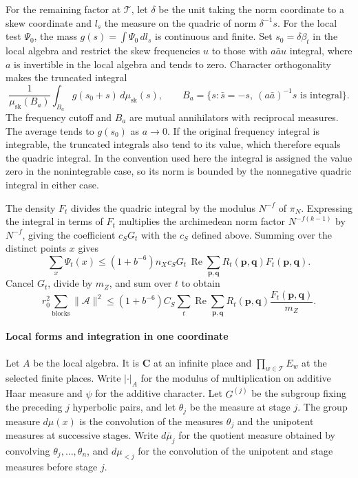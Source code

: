 For the remaining factor at \(\mathcal T\), let \(\delta\) be the unit
taking the norm coordinate to a skew coordinate and \(l_s\) the
measure on the quadric of norm \(\delta^{-1}s\).
For the local test \(\Psi_0\), the mass \(g(s)=\int\Psi_0\,dl_s\) is
continuous and finite. Set \(s_0=\delta\beta_t\) in the local algebra and
restrict the skew frequencies \(u\) to those with \(a\bar a u\) integral,
where \(a\) is invertible in the local algebra and tends to zero.
Character orthogonality makes the truncated integral
\[
 \frac{1}{\mu_\mathrm{sk}(B_a)}
       \int_{B_a}g(s_0+s)\,d\mu_\mathrm{sk}(s),\qquad
 B_a=\{s:\bar s=-s,\ (a\bar a)^{-1}s\text{ is integral}\}.
\]
The frequency cutoff and \(B_a\) are mutual annihilators with reciprocal
measures. The average tends to \(g(s_0)\) as \(a\to0\).
If the original frequency integral is integrable, the truncated
integrals also tend to its value, which therefore equals the quadric
integral. In the convention used here the integral is assigned the value
zero in the nonintegrable case, so its norm is bounded by the
nonnegative quadric integral in either case.

The density \(F_t\) divides the quadric integral by
the modulus \(N^{-f}\) of \(\pi_N\). Expressing the integral in terms of
\(F_t\) multiplies the archimedean norm factor \(N^{-f(k-1)}\) by \(N^{-f}\),
giving the coefficient \(c_SG_t\) with the \(c_S\) defined above.
Summing over the distinct points \(x\) gives
\[
 \sum_x\Psi_t(x)\le(1+b^{-6})n_X c_S G_t\,
             \operatorname{Re}\sum_{\mathbf p,\mathbf q}R_t(\mathbf p,\mathbf q)
                                                       F_t(\mathbf p,\mathbf q).
\]
Cancel \(G_t\), divide by \(m_Z\), and sum over \(t\) to obtain
\begin{equation}\label{eq:span-siegel-sum}
 r_0^2\sum_{\mathrm{blocks}}\|\mathcal A\|^2
 \le (1+b^{-6})C_S\sum_t\operatorname{Re}\sum_{\mathbf p,\mathbf q}
                         R_t(\mathbf p,\mathbf q)\frac{F_t(\mathbf p,\mathbf q)}{m_Z}.
\end{equation}

\paragraph{Local forms and integration in one coordinate}\label{par:span-local-transform}
Let \(A\) be the local algebra. It is \(\mathbf C\) at an infinite
place and \(\prod_{w\in\mathcal T}E_w\) at the selected finite places.
Write \(|\cdot|_A\) for the modulus of multiplication on additive
Haar measure and \(\psi\) for the additive character. Let \(G^{(j)}\)
be the subgroup fixing the preceding \(j\) hyperbolic pairs, and let
\(\theta_j\) be the measure at stage \(j\). The group measure \(d\mu(x)\)
is the convolution of the measures \(\theta_j\) and the unipotent
measures at successive stages. Write \(d\bar\mu_j\) for the quotient
measure obtained by convolving \(\theta_j,\ldots,\theta_n\), and
\(d\mu_{<j}\) for the convolution of the unipotent and stage measures
before stage \(j\).

